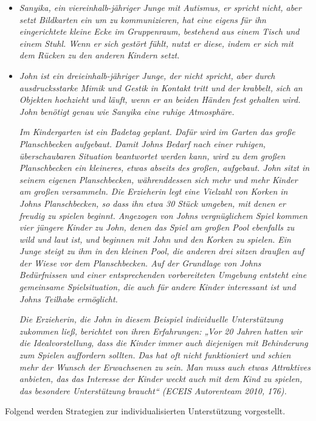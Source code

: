 \begin{itemize}
\item \emph{Sanyika, ein viereinhalb-jähriger Junge mit Autismus, er spricht nicht, aber setzt Bildkarten ein um zu kommunizieren, hat eine eigens für ihn eingerichtete kleine Ecke im Gruppenraum, bestehend aus einem Tisch und einem Stuhl. Wenn er sich gestört fühlt, nutzt er diese, indem er sich mit dem Rücken zu den anderen Kindern setzt.} 

\item \emph{John ist ein dreieinhalb-jähriger Junge, der nicht spricht, aber durch ausdrucksstarke Mimik und Gestik in Kontakt tritt und der krabbelt, sich an Objekten hochzieht und läuft, wenn er an beiden Händen fest gehalten wird. John benötigt genau wie Sanyika eine ruhige Atmosphäre.} 

\emph{Im Kindergarten ist ein Badetag geplant. Dafür wird im Garten das große Planschbecken aufgebaut. Damit Johns Bedarf nach einer ruhigen, überschaubaren Situation beantwortet werden kann, wird zu dem großen Planschbecken ein kleineres, etwas abseits des großen, aufgebaut. John sitzt in seinem eigenen Planschbecken, währenddessen sich mehr und mehr Kinder am großen versammeln. Die Erzieherin legt eine Vielzahl von Korken in Johns Planschbecken, so dass ihn etwa 30 Stück umgeben, mit denen er freudig zu spielen beginnt. Angezogen von Johns vergnüglichem Spiel kommen vier jüngere Kinder zu John, denen das Spiel am großen Pool ebenfalls zu wild und laut ist, und beginnen mit John und den Korken zu spielen. Ein Junge steigt zu ihm in den kleinen Pool, die anderen drei sitzen draußen auf der Wiese vor dem Planschbecken. 
Auf der Grundlage von Johns Bedürfnissen und einer entsprechenden vorbereiteten Umgebung entsteht eine gemeinsame Spielsituation, die auch für andere Kinder interessant ist und Johns Teilhabe ermöglicht.}

\emph{Die Erzieherin, die John in diesem Beispiel individuelle Unterstützung zukommen ließ, berichtet von ihren Erfahrungen: „Vor 20 Jahren hatten wir die Idealvorstellung, dass die Kinder immer auch diejenigen mit Behinderung zum Spielen auffordern sollten. Das hat oft nicht funktioniert und schien mehr der Wunsch der Erwachsenen zu sein. Man muss auch etwas Attraktives anbieten, das das Interesse der Kinder weckt auch mit dem Kind zu spielen, das besondere Unterstützung braucht“ (ECEIS Autorenteam 2010, 176).}
\end{itemize}

Folgend werden Strategien zur individualisierten Unterstützung vorgestellt.
 
